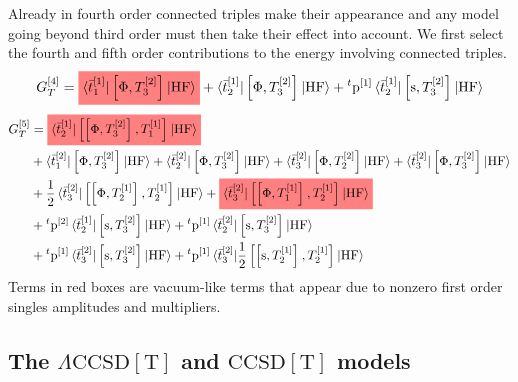 Already in fourth order connected triples make their appearance and any
model going beyond third order must then take their effect into account.
We first select the fourth and fifth order contributions to the energy
involving connected triples.
\begin{equation}\label{eq:triples-fourth-order}
  G_T^{[4]} =
  \highlight{red}{\braket{\tbar{1}^{[1]} | \commutator{\Phi}{T_3^{[2]}} | \mathrm{HF}}}
  + \braket{\tbar{2}^{[1]}| \commutator{\Phi}{T_3^{[2]}} | \mathrm{HF}}
  + {}^t\p^{[1]}\braket{\tbar{2}^{[1]} | \commutator{\s}{T_3^{[2]}} | \mathrm{HF}}
\end{equation}
\begin{equation}\label{eq:triples-fifth-order}
  \begin{aligned}
  G_T^{[5]} &=
    \highlight{red}{
    \braket{\tbar{2}^{[1]} |
    \commutator{\commutator{\Phi}{T_3^{[2]}}}{T_1^{[1]}}
    | \mathrm{HF}}
    } \\
    &+
    \braket{\tbar{1}^{[2]} | \commutator{\Phi}{T_3^{[2]}} | \mathrm{HF}}
  + \braket{\tbar{2}^{[2]} | \commutator{\Phi}{T_3^{[2]}} | \mathrm{HF}}
  + \braket{\tbar{3}^{[2]} | \commutator{\Phi}{T_2^{[2]}} | \mathrm{HF}}
  + \braket{\tbar{3}^{[2]} | \commutator{\Phi}{T_3^{[2]}} | \mathrm{HF}}
  \\
    &+
    \frac{1}{2}\braket{\tbar{3}^{[2]} |
    \commutator{\commutator{\Phi}{T_2^{[1]}}}{T_2^{[1]}}
    | \mathrm{HF}}
  +
  \highlight{red}{
    \braket{\tbar{3}^{[2]} |
    \commutator{\commutator{\Phi}{T_1^{[1]}}}{T_2^{[1]}}
    | \mathrm{HF}}
   }
   \\
   &+
    {}^t\p^{[2]}\braket{\tbar{2}^{[1]} | \commutator{\s}{T_3^{[2]}} | \mathrm{HF}}
  + {}^t\p^{[1]}\braket{\tbar{2}^{[2]} | \commutator{\s}{T_3^{[2]}} | \mathrm{HF}} \\
  &+ {}^t\p^{[1]}\braket{\tbar{3}^{[2]} | \commutator{\s}{T_3^{[2]}} | \mathrm{HF}}
  + {}^t\p^{[1]}\braket{\tbar{3}^{[2]} |
    \frac{1}{2}\commutator{\commutator{\s}{T_2^{[1]}}}{T_2^{[1]}}
    | \mathrm{HF}}
  \end{aligned}
\end{equation}
Terms in red boxes are vacuum-like terms that appear due to nonzero
first order singles amplitudes and multipliers.


\subsection{The \texorpdfstring{$\Lambda\text{CCSD}[\text{T}]$}{CCSD[aT]} and \texorpdfstring{$\text{CCSD}[\text{T}]$}{CCSD[T]} models}

